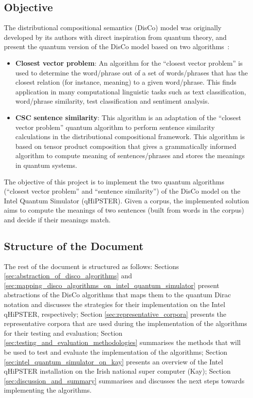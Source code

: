 \subsection{Objective}
The distributional compositional semantics (DisCo) model was originally developed by its authors with direct inspiration from quantum theory, and present the quantum version of the DisCo model based on two algorithms~\cite{Zeng_Coecke_2016}:
\begin{itemize}
  \item \textbf{Closest vector problem}: An algorithm for the “closest vector problem” is used to determine the word/phrase out of a set of words/phrases that has the closest relation (for instance, meaning) to a given word/phrase. This finds application in many computational linguistic tasks such as text classification, word/phrase similarity, test classification and sentiment analysis.
  \item \textbf{CSC sentence similarity}: This algorithm is an adaptation of the “closest vector problem” quantum algorithm to perform sentence similarity calculations in the distributional compositional framework. This algorithm is based on tensor product composition that gives a grammatically informed algorithm to compute meaning of sentences/phrases and stores the meanings in quantum systems.
\end{itemize}

The objective of this project is to implement the two quantum algorithms (“closest vector problem” and “sentence similarity”) of the DisCo model on the Intel Quantum Simulator (qHiPSTER). Given a corpus, the implemented solution aims to compute the meanings of two sentences (built from words in the corpus) and decide if their meanings match.

\subsection{Structure of the Document}
The rest of the document is structured as follows: Sections \ref{sec:abstraction_of_disco_algorithms} and \ref{sec:mapping_disco_algorithms_on_intel_quantum_simulator} present abstractions of the DisCo algorithms that maps them to the quantum Dirac notation and discusses the strategies for their implementation on the Intel qHiPSTER, respectively; Section \ref{sec:representative_corpora} presents the representative corpora that are used during the implementation of the algorithms for their testing and evaluation; Section \ref{sec:testing_and_evaluation_methodologies} summarises the methods that will be used to test and evaluate the implementation of the algorithms; Section \ref{sec:intel_quantum_simulator_on_kay} presents an overview of the Intel qHiPSTER installation on the Irish national super computer (Kay); Section \ref{sec:discussion_and_summary} summarises and discusses the next steps towards implementing the algorithms.